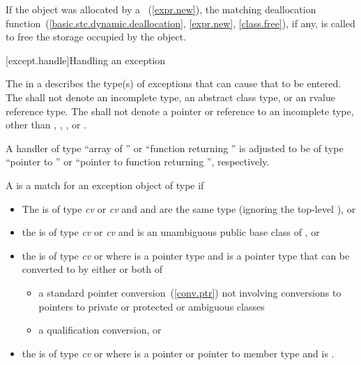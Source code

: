 \pnum
\enternote
If the object was allocated by a ~(\ref{expr.new}),
the matching deallocation function~(\ref{basic.stc.dynamic.deallocation}, \ref{expr.new}, \ref{class.free}),
if any, is called to free the storage occupied by the object.
\exitnote


[except.handle]{Handling an exception}
%

\pnum
The
in a
describes the type(s) of exceptions that can cause
that
to be entered.
%
%
%
%
The
shall not denote an incomplete type, an abstract class type, or an rvalue reference type.
The
shall not denote a pointer or reference to an
incomplete type, other than
,
,
,
or
.

\pnum
A handler of type ``array of
''
or ``function returning
''
is adjusted to be of type ``pointer to
''
or ``pointer to function
returning
'',
respectively.

\pnum
{}%
A
is a match for
an exception object
of type
if
\begin{itemize}
\item%
The
is of type
\textit{cv}
or
\textit{cv}
and
and
are the same type (ignoring the top-level
),
or
\item%
the
is of type
\textit{cv}
or
\textit{cv}
and
is an unambiguous public base class of
,
or
\item%
the
is of type
\textit{cv}
 or  where  is a pointer type
and
is a pointer type that can be
converted to 
by either or both of
\begin{itemize}

\item%
a standard pointer conversion~(\ref{conv.ptr}) not involving conversions
to pointers to private or protected or ambiguous classes
\item%
a qualification conversion, or

\end{itemize}

\item
the  is of type \textit{cv}  or  where  is a pointer or pointer to member type and  is .

\end{itemize}

